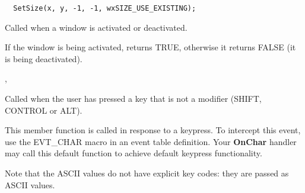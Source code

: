 \begin{verbatim}
  SetSize(x, y, -1, -1, wxSIZE_USE_EXISTING);
\end{verbatim}




\label{wxwindowonactivate}


Called when a window is activated or deactivated.




If the window is being activated,  returns TRUE,
otherwise it returns FALSE (it is being deactivated).


,\rtfsp
{}

\label{wxwindowonchar}


Called when the user has pressed a key that is not a modifier (SHIFT, CONTROL or ALT).




This member function is called in response to a keypress. To intercept this event,
use the EVT\_CHAR macro in an event table definition. Your {\bf OnChar} handler may call this
default function to achieve default keypress functionality.

Note that the ASCII values do not have explicit key codes: they are passed as ASCII
values.

